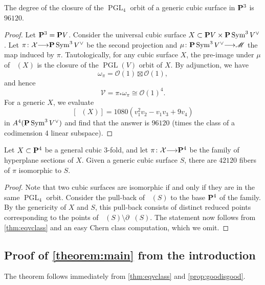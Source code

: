 \documentclass[reqno]{amsart}
\DeclareMathOperator{\Orb}{\overline{Orb}}
\renewcommand{\to}{{\longrightarrow}}
\renewcommand {\P}{{\bf P}}
\providecommand{\PGL}{\operatorname{PGL}}
\providecommand{\Sym}{\operatorname{Sym}}
\numberwithin{equation}{section}
\renewcommand{\O}{\mathcal{O}}
\begin{document}
\begin{corollary}
  The degree of the closure of the $\PGL_4$ orbit of a generic cubic surface in $\P^3$ is $96120$.
\end{corollary}
\begin{proof}
  Let $\P^3 = \P V$.
  Consider the universal cubic surface $X \subset \P V\times \P \Sym^3 V^{\vee}$.
  Let $\pi \colon \mathcal{X} \to \P \Sym^3 V^{\vee}$ be the second projection and $\mu \colon \P \Sym^3 V^{\vee} \to \mathscr{M}$ the map induced by $\pi$.
  Tautologically, for any cubic surface $X$, the pre-image under $\mu$ of $\Orb(X)$ is the closure of the $\PGL(V)$ orbit of $X$.
  By adjunction, we have
  \[ \omega_{\pi} = \O(1) \boxtimes \O(1),\]
  and hence
  \[ \mathcal{V} = \pi_* \omega_{\pi} \cong \O(1)^4.\]
  For a generic $X$, we evaluate
  \[ [\Orb(X)] = 1080(v_1^2v_2 - v_1v_3+9v_4)\]
  in $A^4(\P \Sym^3V^{\vee})$ and find that the answer is $96120$ (times the class of a codimension 4 linear subspace).
\end{proof}

\begin{corollary}
  Let $X \subset \P^4$ be a general cubic 3-fold, and let $\pi \colon \mathcal{X} \to \P^4$ be the family of hyperplane sections of $X$.
  Given a generic cubic surface $S$, there are $42120$ fibers of $\pi$ isomorphic to $S$.
\end{corollary}
\begin{proof}
  Note that two cubic surfaces are isomorphic if and only if they are in the same $\PGL_4$ orbit.
  Consider the pull-back of $\Orb(S)$ to the base $\P^4$ of the family.
  By the genericity of $X$ and $S$, this pull-back consists of distinct reduced points corresponding to the points of $\Orb(S) \setminus \partial \Orb(S)$.
  The statement now follows from \autoref{thm:eqvclass} and an easy Chern class computation, which we omit.
\end{proof}

\subsection{Proof of \texorpdfstring{\autoref{theorem:main}}{first theorem} from the introduction}
The theorem follows immediately from \autoref{thm:eqvclass} and \autoref{prop:goodisgood}.
\end{document}
